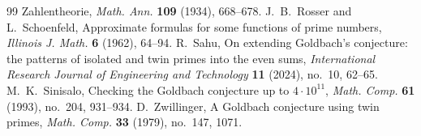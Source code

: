 \documentclass[10pt]{article}
\theoremstyle{definition}
\theoremstyle{remark}
\begin{document}
\begin{thebibliography}{99}
Zahlentheorie, \emph{Math. Ann.} \textbf{109} (1934), 668--678.
 J.~B.~Rosser and L.~Schoenfeld, Approximate formulas for some
functions of prime numbers, \emph{Illinois J. Math.} \textbf{6} (1962),
64--94.
 R.~Sahu, On extending Goldbach's conjecture: the patterns
of isolated and twin primes into the even sums, \emph{International
Research Journal of Engineering and Technology} \textbf{11} (2024),
no.~10, 62--65.
 M.~K.~Sinisalo, Checking the Goldbach conjecture up to
$4 \cdot 10^{11}$, \emph{Math. Comp.} \textbf{61} (1993), no.~204,
931--934.
 D.~Zwillinger, A Goldbach conjecture using twin primes,
\emph{Math. Comp.} \textbf{33} (1979), no.~147, 1071.
\end{thebibliography}
\end{document}

